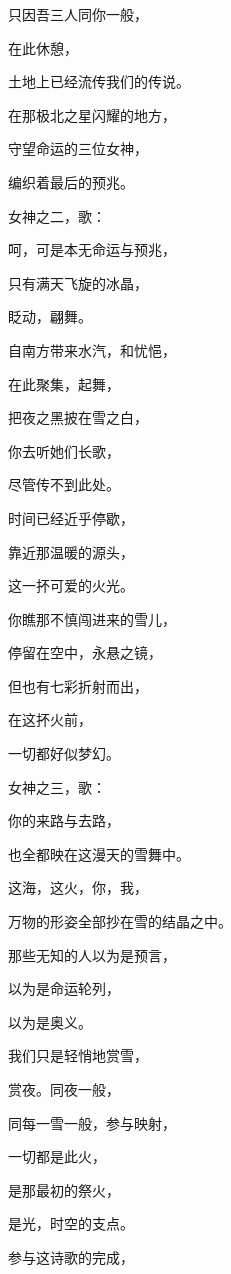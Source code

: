 \documentclass[UTF8]{article}
\begin{document}
\par 只因吾三人同你一般，
\par 在此休憩，
\par 土地上已经流传我们的传说。
\par 在那极北之星闪耀的地方，
\par 守望命运的三位女神，
\par 编织着最后的预兆。
\\[0.6cm]
\par 女神之二，歌：
\\[0.6cm]
\par 呵，可是本无命运与预兆，
\par 只有满天飞旋的冰晶，
\par 眨动，翩舞。
\par 自南方带来水汽，和忧悒，
\par 在此聚集，起舞，
\par 把夜之黑披在雪之白，
\par 你去听她们长歌，
\par 尽管传不到此处。
\par 时间已经近乎停歇，
\par 靠近那温暖的源头，
\par 这一抔可爱的火光。
\par 你瞧那不慎闯进来的雪儿，
\par 停留在空中，永悬之镜，
\par 但也有七彩折射而出，
\par 在这抔火前，
\par 一切都好似梦幻。
\\[0.6cm]
\par 女神之三，歌：
\\[0.6cm]
\par 你的来路与去路，
\par 也全都映在这漫天的雪舞中。
\par 这海，这火，你，我，
\par 万物的形姿全部抄在雪的结晶之中。
\par 那些无知的人以为是预言，
\par 以为是命运轮列，
\par 以为是奥义。
\par 我们只是轻悄地赏雪，
\par 赏夜。同夜一般，
\par 同每一雪一般，参与映射，
\par 一切都是此火，
\par 是那最初的祭火，
\par 是光，时空的支点。
\par 参与这诗歌的完成，
\end{document}
